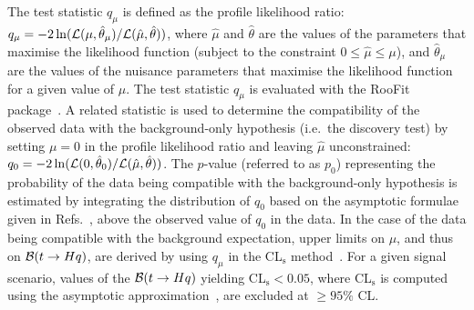 The test statistic $q_\mu$ is defined as the profile likelihood ratio: 
$q_\mu = -2\ln({\cal L}(\mu,{\hat{\theta}}_\mu)/{\cal L}(\hat{\mu},\hat{\theta}))$,
where $\hat{\mu}$ and $\hat{\theta}$ are the values of the parameters that
maximise the likelihood function (subject to the constraint $0\leq \hat{\mu} \leq \mu$), and ${\hat{\theta}}_\mu$ are the values of the
nuisance parameters that maximise the likelihood function for a given value of $\mu$. 
The test statistic $q_\mu$ is evaluated with the {\textsc RooFit} package~\cite{Verkerke:2003ir,RooFitManual}.
A related statistic is used to determine the compatibility of the observed data with the background-only hypothesis (i.e.~the discovery test)  
by setting $\mu=0$ in the profile likelihood ratio and leaving $\hat{\mu}$ unconstrained: $q_0 = -2\ln({\cal L}(0,{\hat{\theta}}_0)/{\cal L}(\hat{\mu},\hat{\theta}))$.
The $p$-value (referred to as $p_0$) representing the probability of the data being compatible with the background-only hypothesis is estimated by integrating
the distribution of $q_0$ based on the asymptotic formulae given in Refs.~\cite{Cowan:2010js}, 
above the observed value of $q_0$ in the data. 
In the case of the data being compatible with the background expectation, upper limits on $\mu$, and thus on 
$\mathcal{B}(t\to Hq)$, are derived by using $q_\mu$ in the CL$_{\textrm{s}}$ method~\cite{Junk:1999kv,Read:2002hq}.
For a given signal scenario, values of the $\mathcal{B}(t\to Hq)$ yielding CL$_{\textrm{s}} < 0.05$, 
where CL$_{\textrm{s}}$ is computed using the asymptotic approximation~\cite{Cowan:2010js}, are excluded at $\geq 95\%$ CL.


